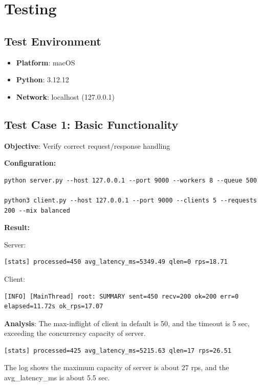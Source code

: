 \documentclass[12pt]{article}
\begin{document}
\section{Testing}

\subsection{Test Environment}

\begin{itemize}
    \item \textbf{Platform}: macOS
    \item \textbf{Python}: 3.12.12
    \item \textbf{Network}: localhost (127.0.0.1)
\end{itemize}

\subsection{Test Case 1: Basic Functionality}

\textbf{Objective}: Verify correct request/response handling

\textbf{Configuration:}
\begin{verbatim}
python server.py --host 127.0.0.1 --port 9000 --workers 8 --queue 500

python3 client.py --host 127.0.0.1 --port 9000 --clients 5 --requests 200 --mix balanced
\end{verbatim}

\textbf{Result:}

Server:
\begin{verbatim}
[stats] processed=450 avg_latency_ms=5349.49 qlen=0 rps=18.71
\end{verbatim}

Client:
\begin{verbatim}
[INFO] [MainThread] root: SUMMARY sent=450 recv=200 ok=200 err=0 elapsed=11.72s ok_rps=17.07
\end{verbatim}

\textbf{Analysis}: The max-inflight of client in default is 50, and the timeout is 5 sec, exceeding the concurrency capacity of server.
\begin{verbatim}
[stats] processed=425 avg_latency_ms=5215.63 qlen=17 rps=26.51
\end{verbatim}

The log shows the maximum capacity of server is about 27 rps, and the avg\_latency\_ms is about 5.5 sec.
\end{document}
